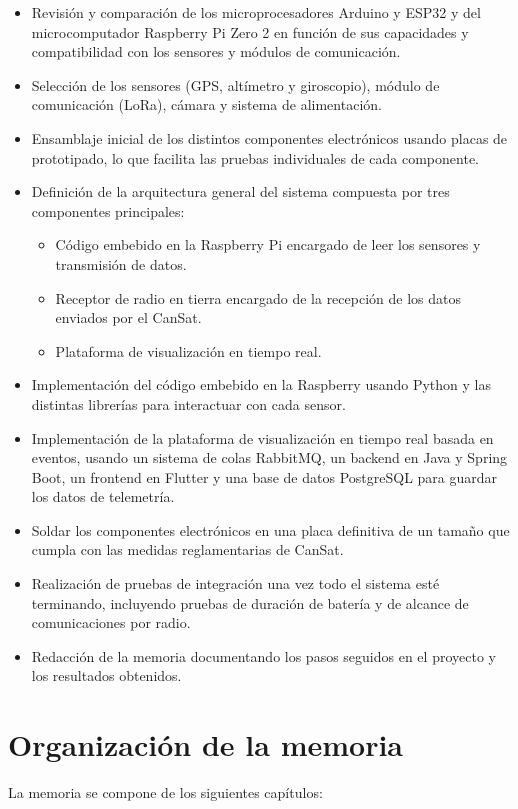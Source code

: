 \begin{itemize}
    \item Revisión y comparación de los microprocesadores Arduino y ESP32 y del microcomputador Raspberry Pi Zero 2 en función de sus capacidades y compatibilidad con los sensores y módulos de comunicación.
    \item Selección de los sensores (GPS, altímetro y giroscopio), módulo de comunicación (LoRa), cámara y sistema de alimentación.
    \item Ensamblaje inicial de los distintos componentes electrónicos usando placas de prototipado, lo que facilita las pruebas individuales de cada componente.
    \item Definición de la arquitectura general del sistema compuesta por tres componentes principales:
    \begin{itemize}
        \item Código embebido en la Raspberry Pi encargado de leer los sensores y transmisión de datos.
        \item Receptor de radio en tierra encargado de la recepción de los datos enviados por el CanSat.
        \item Plataforma de visualización en tiempo real.
    \end{itemize}
    \item Implementación del código embebido en la Raspberry usando Python y las distintas librerías para interactuar con cada sensor.
    \item Implementación de la plataforma de visualización en tiempo real basada en eventos, usando un sistema de colas RabbitMQ, un backend en Java y Spring Boot, un frontend en Flutter y una base de datos PostgreSQL para guardar los datos de telemetría.
    \item Soldar los componentes electrónicos en una placa definitiva de un tamaño que cumpla con las medidas reglamentarias de CanSat.
    \item Realización de pruebas de integración una vez todo el sistema esté terminando, incluyendo pruebas de duración de batería y de alcance de comunicaciones por radio.
    \item Redacción de la memoria documentando los pasos seguidos en el proyecto y los resultados obtenidos.
\end{itemize}


\section{Organizaci\'on de la memoria}
La memoria se compone de los siguientes capítulos: